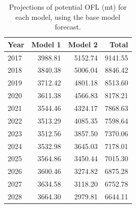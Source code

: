 \documentclass[12pt,]{article}
\begin{document}
\begin{table}[ht]
\centering
\caption{Projections of potential OFL (mt) for each model, using the base model forecast.} 
\label{tab:OFL_projection}
\begin{tabular}{lrrr}
  \hline
Year & Model 1 & Model 2 & Total \\ 
  \hline
2017 & 3988.81 & 5152.74 & 9141.55 \\ 
  2018 & 3840.38 & 5006.04 & 8846.42 \\ 
  2019 & 3712.42 & 4801.18 & 8513.60 \\ 
  2020 & 3611.38 & 4566.83 & 8178.21 \\ 
  2021 & 3544.46 & 4324.17 & 7868.63 \\ 
  2022 & 3513.29 & 4085.35 & 7598.64 \\ 
  2023 & 3512.56 & 3857.50 & 7370.06 \\ 
  2024 & 3532.98 & 3645.03 & 7178.01 \\ 
  2025 & 3564.86 & 3450.44 & 7015.30 \\ 
  2026 & 3600.46 & 3274.82 & 6875.28 \\ 
  2027 & 3634.58 & 3118.20 & 6752.78 \\ 
  2028 & 3664.30 & 2979.81 & 6644.11 \\ 
   \hline
\end{tabular}
\end{table}\begin{table}[ht]
\centering
\caption{Summary of 10-year 
                                             projections beginning in 2018 
                                             for alternate states of nature based on 
                                             an axis of uncertainty for the Northern model.  Columns range over low, mid, and high
                                             states of nature, and rows range over different 
                                             assumptions of catch levels. An entry of "--" 
                                             indicates that the stock is driven to very low 
                                             abundance under the particular scenario.} 
\label{tab:Decision_table_mod1}
\end{table}
\end{document}
